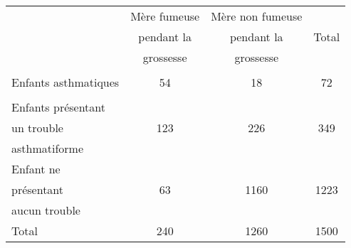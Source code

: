 \begin{tabular}{|@{\ }l@{\ }|@{\ }c@{\ }|@{\ }c@{\ }|@{\ \ \ \ \ }c@{\ \ \ \ \ }|}
	\hline
                     & Mère fumeuse & Mère non fumeuse &  \\
                     & pendant la                       & pendant la                           & Total                \\
                     & grossesse                        & grossesse                            &                      \\
	\hline
	& & &\\
Enfants asthmatiques &        54                        &    18                                & 72                   \\
	& & &\\
	\hline
Enfants présentant   &                                  &                                      &                      \\
un trouble           & 123                              &   226                                &  349                 \\
asthmatiforme        &                                  &                                      &                      \\
	\hline
Enfant ne            &                                  &                                      &                      \\
présentant           &   63                             &    1160                              & 1223                 \\
aucun trouble        &                                  &                                      &                      \\
	\hline
Total                & 240                              &      1260                            & 1500                \\
	\hline
\end{tabular}